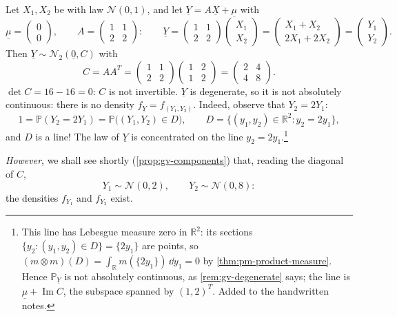 \begin{example}\label{exa:gv-degenerate}
Let $X_1,X_2$ be \iid with law $\mathcal N(0,1)$, and let
$\underline Y=A\underline X+\underline\mu$ with
\[
  \underline\mu=\begin{pmatrix}0\\0\end{pmatrix},\qquad A=\begin{pmatrix}1&1\\2&2\end{pmatrix}:\qquad
  \underline Y=\begin{pmatrix}1&1\\2&2\end{pmatrix}\begin{pmatrix}X_1\\X_2\end{pmatrix}
  =\begin{pmatrix}X_1+X_2\\2X_1+2X_2\end{pmatrix}=\begin{pmatrix}Y_1\\Y_2\end{pmatrix}.
\]
Then $\underline Y\sim\mathcal N_2(\underline 0,C)$ with
\[
  C=AA^T=\begin{pmatrix}1&1\\2&2\end{pmatrix}\begin{pmatrix}1&2\\1&2\end{pmatrix}=\begin{pmatrix}2&4\\4&8\end{pmatrix}.
\]
$\det C=16-16=0$: $C$ is not invertible. $\underline Y$ is degenerate, so it is not absolutely
continuous: there is no density $f_{\underline Y}=f_{(Y_1,Y_2)}$. Indeed, observe that $Y_2=2Y_1$:
\[
  1=\mathbb P(Y_2=2Y_1)=\mathbb P\big((Y_1,Y_2)\in D\big),\qquad D=\{(y_1,y_2)\in\mathbb R^2:y_2=2y_1\},
\]
and $D$ is a line! The law of $\underline Y$ is concentrated on the line $y_2=2y_1$.\footnote{This
line has Lebesgue measure zero in $\mathbb R^2$: its sections $\{y_2:(y_1,y_2)\in D\}=\{2y_1\}$ are
points, so $(m\otimes m)(D)=\int_{\mathbb R}m(\{2y_1\})\,\dd y_1=0$ by \cref{thm:pm-product-measure}.
Hence $\mathbb P_{\underline Y}$ is not absolutely continuous, as \cref{rem:gv-degenerate} says; the
line is $\underline\mu+\operatorname{Im}C$, the subspace spanned by $(1,2)^T$. Added to the
handwritten notes.}

\emph{However}, we shall see shortly (\cref{prop:gv-components}) that, reading the diagonal of $C$,
\[
  Y_1\sim\mathcal N(0,2),\qquad Y_2\sim\mathcal N(0,8):
\]
the densities $f_{Y_1}$ and $f_{Y_2}$ exist.
\end{example}

